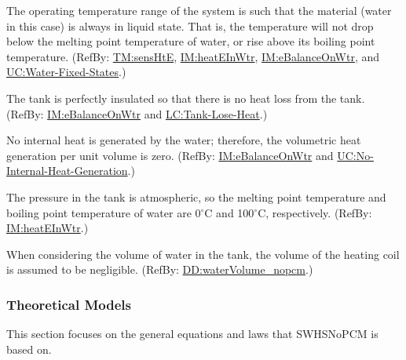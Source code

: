 \documentclass[12pt]{article}
\begin{document}
\begin{description}[font=\normalfont]
\item[Water-Always-Liquid:\phantomsection\label{assumpWAL}]{The operating temperature range of the system is such that the material (water in this case) is always in liquid state. That is, the temperature will not drop below the melting point temperature of water, or rise above its boiling point temperature. (RefBy: \hyperref[TM:sensHtE]{TM:sensHtE}, \hyperref[IM:heatEInWtr]{IM:heatEInWtr}, \hyperref[IM:eBalanceOnWtr]{IM:eBalanceOnWtr}, and \hyperref[unlikeChgWFS]{UC:Water-Fixed-States}.)}
\item[Perfect-Insulation-Tank:\phantomsection\label{assumpPIT}]{The tank is perfectly insulated so that there is no heat loss from the tank. (RefBy: \hyperref[IM:eBalanceOnWtr]{IM:eBalanceOnWtr} and \hyperref[likeChgTLH]{LC:Tank-Lose-Heat}.)}
\item[No-Internal-Heat-Generation-By-Water:\phantomsection\label{assumpNIHGBW}]{No internal heat is generated by the water; therefore, the volumetric heat generation per unit volume is zero. (RefBy: \hyperref[IM:eBalanceOnWtr]{IM:eBalanceOnWtr} and \hyperref[unlikeChgNIHG]{UC:No-Internal-Heat-Generation}.)}
\item[Atmospheric-Pressure-Tank:\phantomsection\label{assumpAPT}]{The pressure in the tank is atmospheric, so the melting point temperature and boiling point temperature of water are 0${{}^{\circ}\text{C}}$ and 100${{}^{\circ}\text{C}}$, respectively. (RefBy: \hyperref[IM:heatEInWtr]{IM:heatEInWtr}.)}
\item[Volume-Coil-Negligible:\phantomsection\label{assumpVCN}]{When considering the volume of water in the tank, the volume of the heating coil is assumed to be negligible. (RefBy: \hyperref[DD:waterVolume.nopcm]{DD:waterVolume\_nopcm}.)}
\end{description}
\subsubsection{Theoretical Models}
\label{Sec:TMs}
This section focuses on the general equations and laws that SWHSNoPCM is based on.
\end{document}
